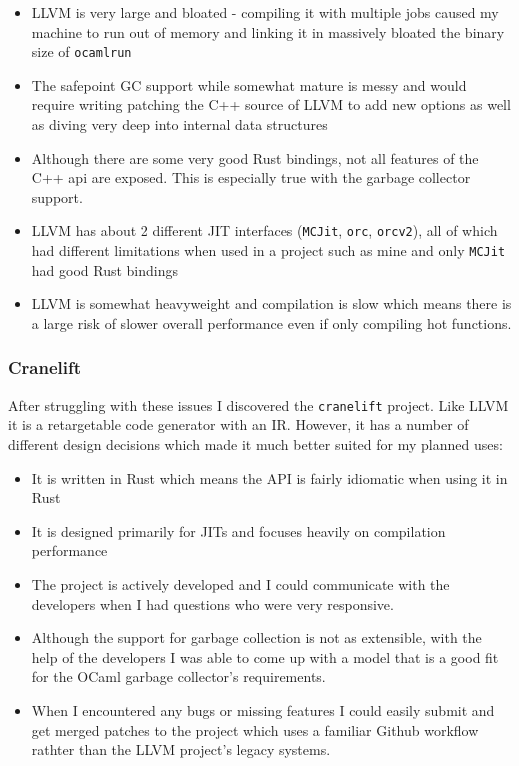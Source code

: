 \begin{itemize}
      \item LLVM is very large and bloated - compiling it with multiple jobs caused my machine to
            run out of memory and linking it in massively bloated the binary size of
            \texttt{ocamlrun}
      \item The safepoint GC support while somewhat mature is messy and would require writing
            patching the C++ source of LLVM to add new options as well as diving very deep into
            internal data
            structures
      \item Although there are some very good Rust bindings, not all features of the C++ api are
            exposed. This is especially true with the garbage collector support.
      \item LLVM has about 2 different JIT interfaces (\texttt{MCJit}, \texttt{orc},
            \texttt{orcv2}),
            all of which had different limitations when used in a project such as mine and only
            \texttt{MCJit} had good Rust bindings
      \item LLVM is somewhat heavyweight and compilation is slow which means there is a large risk
            of slower overall performance even if only compiling hot functions.
\end{itemize}

\subsubsection{Cranelift}

After struggling with these issues I discovered the \texttt{cranelift} project. Like LLVM it is a
retargetable code generator with an IR. However, it has a number of different design decisions
which made it much better suited for my planned uses:

\begin{itemize}
      \item It is written in Rust which means the API is fairly idiomatic when using it in Rust
      \item It is designed primarily for JITs and focuses heavily on compilation performance
      \item The project is actively developed and I could communicate with the developers when I
            had
            questions who were very responsive.
      \item Although the support for garbage collection is not as extensible, with the help of the
            developers I was able to come up with a model that is a good fit for the OCaml garbage
            collector's
            requirements.
      \item When I encountered any bugs or missing features I could easily submit and get merged
            patches to the project which uses a familiar Github workflow rathter than the LLVM
            project's legacy
            systems.
\end{itemize}

